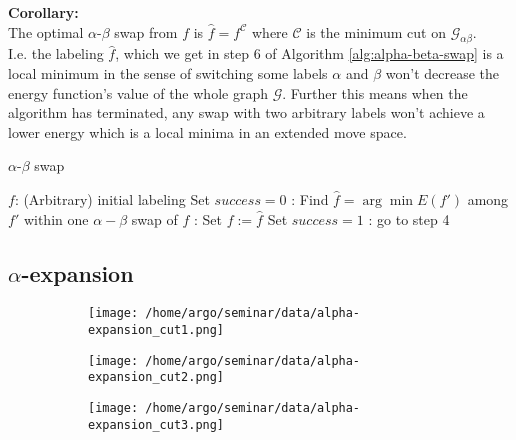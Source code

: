 \documentclass{scrartcl}[12pt, halfparskip]
\begin{document}
\textbf{Corollary:}\\
The optimal $\alpha$-$\beta$ swap from $f$ is $\hat{f} = f^\mathcal{C}$ where $\mathcal{C}$ is the minimum cut on $\mathcal{G}_{\alpha \beta}$. \\


I.e. the labeling $\hat{f}$, which we get in step 6 of Algorithm \ref{alg:alpha-beta-swap} is a local minimum in the sense of switching some labels $\alpha$ and $\beta$ won't decrease the energy function's value of the whole graph $\mathcal{G}$. Further this means when the algorithm has terminated, any swap with two arbitrary labels won't achieve a lower energy which is a local minima in an extended move space.



\begin{algorithm}[H]
\caption{$\alpha$-$\beta$ swap}\label{alg:alpha-beta-swap}
\begin{algorithmic}[1]
	\State $f$: (Arbitrary) initial labeling 
	\State
	\State Set $success = 0$
	:
		\State Find $\hat{f} = \arg \min E(f')$ among $f'$ within one $\alpha-\beta$ swap of $f$
		:
			\State Set $f := \hat{f}$
			\State Set $success = 1$
		\EndIf
	\EndFor
	:
		\State go to step 4
	\EndIf
	\State
	\State {}
\EndProcedure
\end{algorithmic}
\end{algorithm}








\subsection{$\alpha$-expansion}



\begin{figure}[H]
	\begin{subfigure}{0.32\textwidth}
		\centering
		\texttt{[image: /home/argo/seminar/data/alpha-expansion\_cut1.png]}
		\caption{}
		\label{fig:alpha-expansion_Gab_cut1}
	\end{subfigure}
	\begin{subfigure}{0.32\textwidth}
		\centering
		\texttt{[image: /home/argo/seminar/data/alpha-expansion\_cut2.png]}
		\caption{}
		\label{fig:alpha-expansion_Gab_cut2}
	\end{subfigure}
	\begin{subfigure}{0.32\textwidth}
		\centering
		\texttt{[image: /home/argo/seminar/data/alpha-expansion\_cut3.png]}
		\caption{}
		\label{fig:alpha-expansion_Gab_cut3}
	\end{subfigure}
\label{fig:alpha-expansion_Gab_cuts}
\caption{}
\end{figure}
\end{document}
